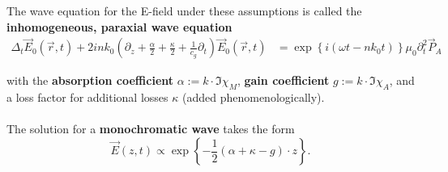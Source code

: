 \documentclass{article}
\newcommand{\lr}[1]{\left(#1\right)}
\newcommand{\lrschweif}[1]{\left\{#1\right\}}
\begin{document}
The wave equation for the E-field under these assumptions is called the \textbf{inhomogeneous, paraxial wave equation}
	\begin{align*}
		\Delta_t \vec{E}_0(\vec{r},t) + 2 i n k_0 \lr{ \partial_z + \frac{\alpha}{2} + \frac{\kappa}{2} + \frac{1}{c_g}\partial_t } \vec{E}_0(\vec{r},t) &= \exp\lrschweif{ i(\omega t - n k_0 t) } \mu_0 \partial_t^2 \vec{P}_A
	\end{align*}

with the \textbf{absorption coefficient} $\alpha := k \cdot \Im\chi_M$, \textbf{gain coefficient} $g := k \cdot \Im\chi_A$, and a loss factor for additional losses $\kappa$ \textcolor{gruen}{(added phenomenologically)}.\\
\\
The solution for a \textbf{monochromatic wave} takes the form
	\begin{equation}
		\vec{E}(z,t) \propto \exp \lrschweif{ - \frac{1}{2}\lr{ \alpha + \kappa - g } \cdot z }.
	\end{equation}


\newpage
\end{document}
